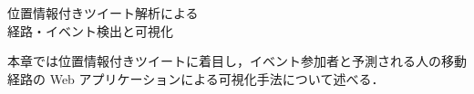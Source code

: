 \chapterhead
{位置情報付きツイート解析による\\
経路・イベント検出と可視化}

{本章では位置情報付きツイートに着目し，イベント参加者と予測される人の移動経路の Web アプリケーションによる可視化手法について述べる．}


\newpage
